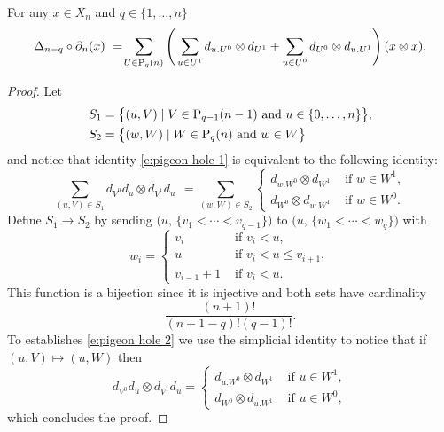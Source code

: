 \begin{lemma} \label{l:pigeon hole}
	For any $x \in X_n$ and $q \in \{1, \dots, n\}$
	\begin{equation} \label{e:pigeon hole 1}
	\Delta_{n-q} \circ \partial_n (x)\ =\! 
	\sum_{U \in \P_q(n)} \left( \,
	\sum_{u \in U^1} d_{u.U^0} \otimes d_{U^1} + 
	\sum_{u \in U^0} d_{U^0} \otimes d_{u.U^1} \right)(x \otimes x).
	\end{equation}
\end{lemma}

\begin{proof}
	Let
	\begin{align*}
	& S_1 = \big\{ (u, V)\mid V \in \P_{q-1}(n-1) \text{ and } u \in \{0,\dots,n\} \big\}, \\
	& S_2 = \big\{ (w, W)\mid W \in \P_{q}(n) \text{ and } w \in W \big\}
	\end{align*}
	and notice that identity \eqref{e:pigeon hole 1} is equivalent to the following identity:
	\begin{equation} \label{e:pigeon hole 2}
	\sum_{(u, V) \in S_1} d_{V^0}d_u \otimes d_{V^1}d_u \ \, = \!
	\sum_{(w, W) \in S_2} 
	\begin{cases}
	d_{w.W^0} \otimes d_{W^1} & \text{ if } w \in W^1, \\
	d_{W^0} \otimes d_{w.W^1} & \text{ if } w \in W^0.
	\end{cases}
	\end{equation}	
	Define $S_1 \to S_2$ by sending $\big(u,\, \{v_1 < \cdots < v_{q-1}\} \big)$ to $\big(u,\, \{w_1 < \cdots < w_{q}\} \big)$ with
	\begin{equation*}
	w_i = 
	\begin{cases}
	v_i & \text{ if } v_i < u, \\
	u & \text{ if } v_i < u \leq v_{i+1}, \\
	v_{i-1}+1 & \text{ if } v_i < u.
	\end{cases}
	\end{equation*} 
	This function is a bijection since it is injective and both sets have cardinality 
	\begin{equation*}
	\frac{(n+1)!}{(n+1-q)!(q-1)!}.
	\end{equation*}
	To establishes \eqref{e:pigeon hole 2} we use the simplicial identity to notice that if $(u, V) \mapsto (u, W)$ then
	\begin{equation*}
	d_{V^0}d_u \otimes d_{V^1}d_u =
	\begin{cases}
	d_{u.W^0} \otimes d_{W^1} & \text{ if } u \in W^1, \\
	d_{W^0} \otimes d_{u.W^1} & \text{ if } u \in W^0,
	\end{cases}
	\end{equation*}
	which concludes the proof.
\end{proof}

